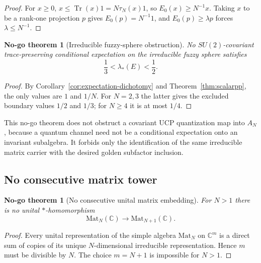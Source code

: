 \documentclass[aps,prd,preprint,nofootinbib,superscriptaddress]{revtex4-2}
\newtheorem{nogotheorem}[theorem]{No-go theorem}
\theoremstyle{definition}
\theoremstyle{remark}
\newcommand{\Tr}{\operatorname{Tr}}
\newcommand{\PP}{\lambda_*}
\begin{document}
\begin{proof}
For $x\ge0$, $x\le\Tr(x)1=N\tau_N(x)1$, so $E_0(x)\ge N^{-1}x$.  Taking $x$ to be a rank-one projection $p$ gives $E_0(p)=N^{-1}1$, and $E_0(p)\ge\lambda p$ forces $\lambda\le N^{-1}$.
\end{proof}

\begin{nogotheorem}[Irreducible fuzzy-sphere obstruction]
\label{thm:fuzzynogo}
No $SU(2)$-covariant trace-preserving conditional expectation on the irreducible fuzzy sphere satisfies
\begin{equation}
\frac13<\PP(E)<\frac12.
\label{eq:gold-window}
\end{equation}
\end{nogotheorem}

\begin{proof}
By Corollary~\ref{cor:expectation-dichotomy} and Theorem~\ref{thm:scalarpp}, the only values are $1$ and $1/N$.  For $N=2,3$ the latter gives the excluded boundary values $1/2$ and $1/3$; for $N\ge4$ it is at most $1/4$.
\end{proof}

This no-go theorem does not obstruct a covariant UCP quantization map into $A_N$, because a quantum channel need not be a conditional expectation onto an invariant subalgebra.  It forbids only the identification of the same irreducible matrix carrier with the desired golden subfactor inclusion.

\subsection{No consecutive matrix tower}

\begin{nogotheorem}[No consecutive unital matrix embedding]
\label{thm:matrixembedding}
For $N>1$ there is no unital $*$-homomorphism
\begin{equation}
\mathrm{Mat}_N(\mathbb C)\longrightarrow\mathrm{Mat}_{N+1}(\mathbb C).
\end{equation}
\end{nogotheorem}

\begin{proof}
Every unital representation of the simple algebra $\mathrm{Mat}_N$ on $\mathbb C^m$ is a direct sum of copies of its unique $N$-dimensional irreducible representation.  Hence $m$ must be divisible by $N$.  The choice $m=N+1$ is impossible for $N>1$.
\end{proof}
\end{document}
